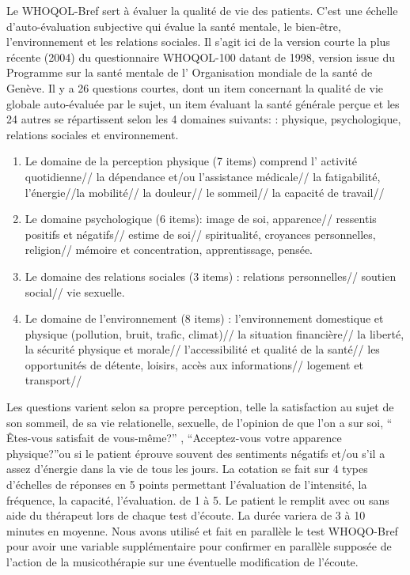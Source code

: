 Le  WHOQOL-Bref sert à évaluer la qualité de vie des patients. C'est une échelle
d'auto-évaluation subjective qui évalue la santé mentale, le
bien-être, l'environnement et les relations sociales.
Il s'agit ici de la version courte  la plus récente (2004) du questionnaire
 WHOQOL-100 datant de 1998, version issue du Programme sur la santé
 mentale de l'
Organisation mondiale de la santé de Genève. Il y a 26 questions
courtes, dont un item concernant la qualité de vie globale
auto-évaluée par le sujet, un item évaluant la santé générale perçue
et les 24 autres se répartissent selon les 4 domaines suivants:  
: physique, psychologique, relations sociales et environnement.
\begin{enumerate}
\item  Le domaine de la perception physique (7 items) comprend l' activité quotidienne// la dépendance et/ou l'assistance médicale// la fatigabilité, l'énergie//la mobilité// la douleur// le sommeil// la capacité de travail//
	
\item Le domaine psychologique (6 items):  image de soi, apparence// ressentis positifs et négatifs// estime de soi// spiritualité, croyances personnelles, religion// mémoire et concentration, apprentissage, pensée.
		
\item Le domaine des relations sociales (3 items) : relations personnelles// soutien social// vie sexuelle.
			
\item Le domaine de l'environnement (8 items) :
                         l'environnement domestique et physique
                         (pollution, bruit, trafic, climat)// la
                         situation financière//  la liberté, la
                         sécurité physique et morale//
                         l'accessibilité et qualité de la santé// les
                         opportunités de détente, loisirs, accès aux
                         informations// logement et transport// 
\end{enumerate}
		
	

Les questions varient selon sa propre perception, telle la satisfaction
au sujet de son  sommeil, de sa vie relationelle, sexuelle, de
l'opinion de que l'on a sur soi,  `` Êtes-vous satisfait de
vous-même?'' , ``Acceptez-vous votre apparence physique?''ou si le patient éprouve souvent des sentiments négatifs
et/ou s'il a assez d'énergie dans la vie de tous les jours.
La cotation se fait sur 4 types d'échelles de réponses en 5 points
permettant l'évaluation de l'intensité, la fréquence, la capacité, l'évaluation.
de 1 à 5.
Le patient le remplit avec ou sans aide du
thérapeut lors de chaque test
d'écoute. La durée variera de 3 à 10 minutes en
moyenne. 
Nous avons utilisé et fait en parallèle le test WHOQO-Bref pour avoir une variable supplémentaire pour confirmer en
parallèle supposée de l'action de la musicothérapie sur une éventuelle modification de l'écoute.


